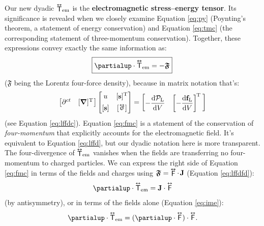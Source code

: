 \documentclass[12pt]{article}
\renewcommand{\vv}[1]{\mathbf{#1}}
\newcommand{\dd}[1]{\mathrm{d}#1}
\newcommand{\del}{\boldsymbol{\nabla}}
\newcommand{\tightoverset}[2]{%
  \mathop{#2}\limits^{\vbox to -.5ex{\kern-0.75ex\hbox{$#1$}\vss}}}
\newcommand{\inlinedy}[1]{\tightoverset{\text{\tiny$\bm\leftrightarrow$}}{#1}}
\newcommand{\capdy}[1]{ \overset{ \text{\tiny$\bm\leftrightarrow$} }{\vphantom{\text{\small{A}}}\smash{#1}} }
\begin{document}
Our new dyadic ${\inlinedy{\mathsf{T}}} _{\textrm{em}}$ is the \textbf{electromagnetic stress--energy tensor}. Its significance is revealed when we closely examine Equation \ref{eq:py} (Poynting's theorem, a statement of energy conservation) and Equation \ref{eq:tmc} (the corresponding statement of three-momentum conservation). Together, these expressions convey exactly the same information as:
\begin{equation}\label{eq:fmc}
\boxed{ \vphantom{A_{A_{A_A}}} \partialup \cdot \capdy{\mathsf{T}}_{\textrm{em}} = - \bm{\mathfrak{F}} } \,
\end{equation}
($\bm{\mathfrak{F}}$ being the Lorentz four-force density), because in matrix notation that's:
\begin{equation}\label{eq:fmcm}
\begin{bmatrix}
\partial^{ct} & [ \del ]^{\mathrm{T}} \mkern1mu
\end{bmatrix}
\begin{bmatrix}
u & [\vv s]^{\mathrm{T}} \\[1ex]
[\vv s] & [ \, \mkern-2mu \inlinedy{\upsigma} \mkern1mu ]
\end{bmatrix}
=
\begin{bmatrix}
- \dfrac{\dd \mathcal{P}_{\textrm{L}}}{\dd V} & \left[ - \dfrac{\dd \vv f_{\mathrm{L}}}{\dd V} \right] ^{\mkern-2mu \mathrm{T} \; }
\end{bmatrix}
\end{equation}
(see Equation \ref{eq:lffdc}). Equation \ref{eq:fmc} is a statement of the conservation of \emph{four-momentum} that explicitly accounts for the electromagnetic field. It's equivalent to Equation \ref{eq:lffd}, but our dyadic notation here is more transparent. The four-divergence of ${\inlinedy{\mathsf{T}}}_{\textrm{em}}$ vanishes when the fields are transferring no four-momentum to charged particles. We can express the right side of Equation \ref{eq:fmc} in terms of the fields and charges using $\bm{\mathfrak{F}} = \inlinedy{\mathsf{F}} \cdot \mkern2mu \vv J$ (Equation \ref{eq:lffdfd}):
\begin{equation*}
\partialup \cdot \capdy{\mathsf{T}}_{\textrm{em}} = \vv J \cdot \capdy{\mathsf{F}}
\end{equation*}
(by antisymmetry), or in terms of the fields alone (Equation \ref{eq:ime}):
\begin{equation*}
\partialup \cdot \capdy{\mathsf{T}}_{\textrm{em}} = ( \partialup \cdot \capdy{\mathsf{F}} ) \cdot \capdy{\mathsf{F}} .
\end{equation*}
\end{document}
